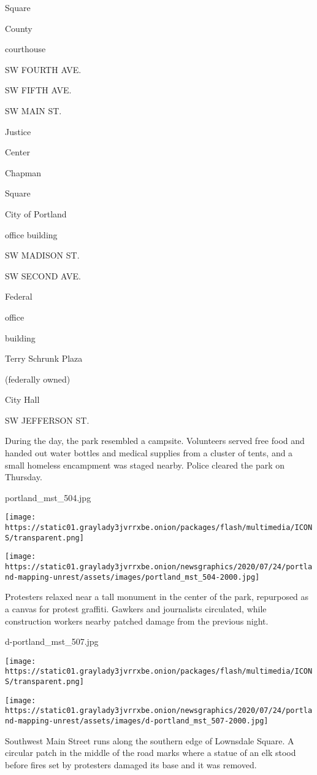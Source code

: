 Square

County

courthouse

SW FOURTH AVE.

SW FIFTH AVE.

SW MAIN ST.

Justice

Center

Chapman

Square

City of Portland

office building

SW MADISON ST.

SW SECOND AVE.

Federal

office

building

Terry Schrunk Plaza

(federally owned)

City Hall

SW JEFFERSON ST.

During the day, the park resembled a campsite. Volunteers served free
food and handed out water bottles and medical supplies from a cluster of
tents, and a small homeless encampment was staged nearby. Police cleared
the park on Thursday.

portland\_mst\_504.jpg

\texttt{[image: https://static01.graylady3jvrrxbe.onion/packages/flash/multimedia/ICONS/transparent.png]}

\texttt{[image: https://static01.graylady3jvrrxbe.onion/newsgraphics/2020/07/24/portland-mapping-unrest/assets/images/portland\_mst\_504-2000.jpg]}

Protesters relaxed near a tall monument in the center of the park,
repurposed as a canvas for protest graffiti. Gawkers and journalists
circulated, while construction workers nearby patched damage from the
previous night.

d-portland\_mst\_507.jpg

\texttt{[image: https://static01.graylady3jvrrxbe.onion/packages/flash/multimedia/ICONS/transparent.png]}

\texttt{[image: https://static01.graylady3jvrrxbe.onion/newsgraphics/2020/07/24/portland-mapping-unrest/assets/images/d-portland\_mst\_507-2000.jpg]}

Southwest Main Street runs along the southern edge of Lownsdale Square.
A circular patch in the middle of the road marks where a statue of an
elk stood before fires set by protesters damaged its base and it was
removed.

